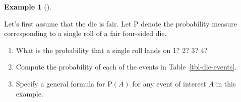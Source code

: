 \documentclass[
  letterpaper,
  DIV=11,
  numbers=noendperiod]{scrreprt}
\providecommand{\tightlist}{%
  \setlength{\itemsep}{0pt}\setlength{\parskip}{0pt}}
\theoremstyle{plain}
\theoremstyle{definition}
\newtheorem{example}{Example}[chapter]
\theoremstyle{definition}
\theoremstyle{definition}
\theoremstyle{remark}
\begin{document}
\begin{tcolorbox}[enhanced jigsaw, opacityback=0, left=2mm, colframe=quarto-callout-note-color-frame, toprule=.15mm, breakable, colback=white, leftrule=.75mm, arc=.35mm, rightrule=.15mm, bottomrule=.15mm]

\begin{example}[]\protect\hypertarget{exm-die-measure-fair}{}\label{exm-die-measure-fair}

Let's first assume that the die is fair. Let \(\textrm{P}\) denote the
probability measure corresponding to a single roll of a fair four-sided
die.

\begin{enumerate}
\def\labelenumi{\arabic{enumi}.}
\tightlist
\item
  What is the probability that a single roll lands on 1? 2? 3? 4?
\item
  Compute the probability of each of the events in
  Table~\ref{tbl-die-events}.
\item
  Specify a general formula for \(\textrm{P}(A)\) for any event of
  interest \(A\) in this example.
\end{enumerate}

\end{example}

\end{tcolorbox}
\end{document}
